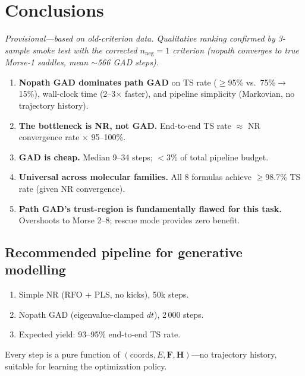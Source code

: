 \documentclass[11pt,a4paper]{article}
\newcommand{\vect}[1]{\mathbf{#1}}
\newcommand{\mat}[1]{\mathbf{#1}}
\newcommand{\hess}{\mat{H}}
\begin{document}
\section{Conclusions}
\label{sec:conclusions}

\noindent\textit{Provisional---based on old-criterion data.  Qualitative
ranking confirmed by 3-sample smoke test with the corrected
$n_\text{neg}=1$ criterion (nopath converges to true Morse-1 saddles,
mean $\sim$566 GAD steps).}

\begin{enumerate}[nosep]
  \item \textbf{Nopath GAD dominates path GAD} on TS rate ($\geq$95\% vs.\
        75\%$\to$15\%), wall-clock time (2--3$\times$ faster), and pipeline
        simplicity (Markovian, no trajectory history).

  \item \textbf{The bottleneck is NR, not GAD.}
        End-to-end TS rate $\approx$ NR convergence rate $\times$ 95--100\%.

  \item \textbf{GAD is cheap.}
        Median 9--34 steps; $<$3\% of total pipeline budget.

  \item \textbf{Universal across molecular families.}
        All 8 formulas achieve $\geq$98.7\% TS rate (given NR convergence).

  \item \textbf{Path GAD's trust-region is fundamentally flawed for this task.}
        Overshoots to Morse 2--8; rescue mode provides zero benefit.
\end{enumerate}

\subsection{Recommended pipeline for generative modelling}

\begin{enumerate}[nosep]
  \item Simple NR (RFO + PLS, no kicks), 50k steps.
  \item Nopath GAD (eigenvalue-clamped $dt$), 2\,000 steps.
  \item Expected yield: 93--95\% end-to-end TS rate.
\end{enumerate}

Every step is a pure function of $(\text{coords}, E, \vect{F}, \hess)$---no
trajectory history, suitable for learning the optimization policy.
\end{document}

